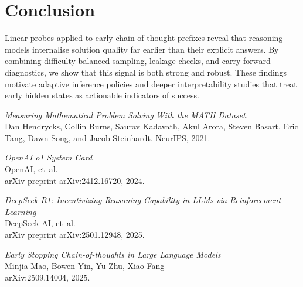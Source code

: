 \documentclass[10pt,a4paper,twocolumn]{article}
\begin{document}
\section{Conclusion}
\label{sec:conclusion}
Linear probes applied to early chain-of-thought prefixes reveal that reasoning models internalise solution quality far earlier than their explicit answers.  By combining difficulty-balanced sampling, leakage checks, and carry-forward diagnostics, we show that this signal is both strong and robust.  These findings motivate adaptive inference policies and deeper interpretability studies that treat early hidden states as actionable indicators of success.

\vspace{-2mm}
\begingroup
\small
\begin{thebibliography}{9}

\textit{Measuring Mathematical Problem Solving With the MATH Dataset.}  \\
Dan Hendrycks, Collin Burns, Saurav Kadavath, Akul Arora, Steven Basart, Eric Tang, Dawn Song, and Jacob Steinhardt.  
NeurIPS, 2021.

\textit{OpenAI o1 System Card}  \\
OpenAI, et~al. \\
arXiv preprint arXiv:2412.16720, 2024.  

\textit{DeepSeek-R1: Incentivizing Reasoning Capability in LLMs via Reinforcement Learning}  \\
DeepSeek-AI, et~al. \\
arXiv preprint arXiv:2501.12948, 2025.

\textit{Early Stopping Chain-of-thoughts in Large Language Models} \\ 
Minjia Mao, Bowen Yin, Yu Zhu, Xiao Fang \\
arXiv:2509.14004, 2025.


\end{thebibliography}

\endgroup
\end{document}
